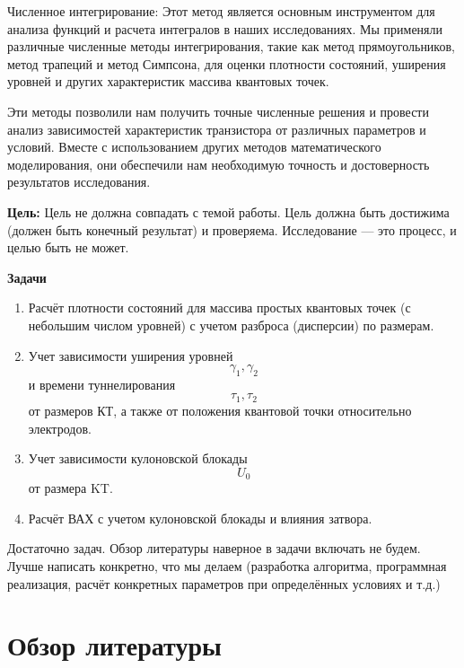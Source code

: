 \documentclass[a4paper,14pt]{extarticle}
\begin{document}
Численное интегрирование: Этот метод является основным инструментом для анализа функций и расчета интегралов в наших исследованиях. Мы применяли различные численные методы интегрирования, такие как метод прямоугольников, метод трапеций и метод Симпсона, для оценки плотности состояний, уширения уровней и других характеристик массива квантовых точек.

Эти методы позволили нам получить точные численные решения и провести анализ зависимостей характеристик транзистора от различных параметров и условий. Вместе с использованием других методов математического моделирования, они обеспечили нам необходимую точность и достоверность результатов исследования.

\label{Tasks}

\textbf{Цель:} Цель не должна совпадать с темой работы. Цель должна быть достижима (должен быть конечный результат) и проверяема. Исследование --- это процесс, и целью быть не может.

\textbf{Задачи}
\begin{enumerate}
    \item  Расчёт плотности состояний для массива простых квантовых точек (с небольшим числом уровней) с учетом разброса (дисперсии) по размерам.
    \item  Учет зависимости уширения уровней 
    \begin{equation}\gamma_{1}, \gamma_{2} \end{equation} и времени туннелирования  \begin{equation} \tau_{1},\tau_{2} \end{equation} от размеров КТ, а также от положения квантовой точки относительно электродов.
    \item  Учет зависимости кулоновской блокады \begin{equation} U_{0}\end{equation} от размера KT.
    \item  Расчёт ВАХ с учетом кулоновской блокады и влияния затвора. 
\end{enumerate}

Достаточно задач. Обзор литературы наверное в задачи включать не будем. Лучше написать конкретно, что мы делаем (разработка алгоритма, программная реализация, расчёт конкретных параметров при определённых условиях и т.д.)

\pagebreak
\section{Обзор литературы}
\end{document}
